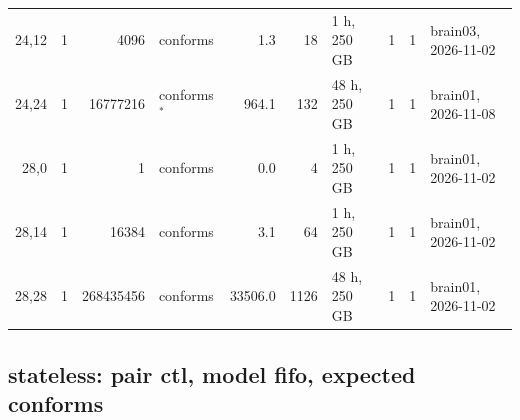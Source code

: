 \documentclass[10pt]{article}
\begin{document}
\begin{longtable}{@{}rrrlrrlrrl@{}}
\color{blue} 24,12 & 1 & 4096 & conforms & 1.3 & 18 & 1 h, 250 GB & 1 & 1 & brain03, 2026-11-02 \\
\color{blue} 24,24 & 1 & 16777216 & conforms$^{\ast}$ & 964.1 & 132 & 48 h, 250 GB & 1 & 1 & brain01, 2026-11-08 \\
\color{blue} 28,0 & 1 & 1 & conforms & 0.0 & 4 & 1 h, 250 GB & 1 & 1 & brain01, 2026-11-02 \\
\color{blue} 28,14 & 1 & 16384 & conforms & 3.1 & 64 & 1 h, 250 GB & 1 & 1 & brain01, 2026-11-02 \\
\color{blue} 28,28 & 1 & 268435456 & conforms & 33506.0 & 1126 & 48 h, 250 GB & 1 & 1 & brain01, 2026-11-02 \\
\bottomrule
\end{longtable}
\subsection*{stateless: pair \textsf{ctl}, model fifo, expected conforms}
\end{document}
